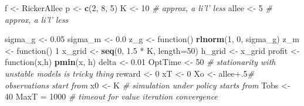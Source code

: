 \documentclass[author-year, review]{elsarticle} %
\newenvironment{Shaded}{}{}
\newcommand{\KeywordTok}[1]{\textcolor[rgb]{0.00,0.44,0.13}{\textbf{{#1}}}}
\newcommand{\DataTypeTok}[1]{\textcolor[rgb]{0.56,0.13,0.00}{{#1}}}
\newcommand{\DecValTok}[1]{\textcolor[rgb]{0.25,0.63,0.44}{{#1}}}
\newcommand{\FloatTok}[1]{\textcolor[rgb]{0.25,0.63,0.44}{{#1}}}
\newcommand{\CommentTok}[1]{\textcolor[rgb]{0.38,0.63,0.69}{\textit{{#1}}}}
\newcommand{\NormalTok}[1]{{#1}}
\begin{document}
\begin{Shaded}
\begin{Highlighting}[]
\NormalTok{f <- RickerAllee}
\NormalTok{p <- }\KeywordTok{c}\NormalTok{(}\DecValTok{2}\NormalTok{, }\DecValTok{8}\NormalTok{, }\DecValTok{5}\NormalTok{)}
\NormalTok{K <- }\DecValTok{10}  \CommentTok{# approx, a li'l' less}
\NormalTok{allee <- }\DecValTok{5} \CommentTok{# approx, a li'l' less}
\end{Highlighting}
\end{Shaded}

\begin{Shaded}
\begin{Highlighting}[]
\NormalTok{sigma_g <- }\FloatTok{0.05}
\NormalTok{sigma_m <- }\FloatTok{0.0}
\NormalTok{z_g <- function() }\KeywordTok{rlnorm}\NormalTok{(}\DecValTok{1}\NormalTok{, }\DecValTok{0}\NormalTok{, sigma_g)}
\NormalTok{z_m <- function() }\DecValTok{1}
\NormalTok{x_grid <- }\KeywordTok{seq}\NormalTok{(}\DecValTok{0}\NormalTok{, }\FloatTok{1.5} \NormalTok{* K, }\DataTypeTok{length=}\DecValTok{50}\NormalTok{)}
\NormalTok{h_grid <- x_grid}
\NormalTok{profit <- function(x,h) }\KeywordTok{pmin}\NormalTok{(x, h)}
\NormalTok{delta <- }\FloatTok{0.01}
\NormalTok{OptTime <- }\DecValTok{50}  \CommentTok{# stationarity with unstable models is tricky thing}
\NormalTok{reward <- }\DecValTok{0}
\NormalTok{xT <- }\DecValTok{0}
\NormalTok{Xo <-  allee}\FloatTok{+.5}\CommentTok{# observations start from}
\NormalTok{x0 <- K }\CommentTok{# simulation under policy starts from}
\NormalTok{Tobs <- }\DecValTok{40}
\NormalTok{MaxT = }\DecValTok{1000} \CommentTok{# timeout for value iteration convergence}
\end{Highlighting}
\end{Shaded}
\end{document}
